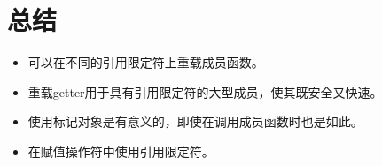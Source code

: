 \section{总结}
\begin{itemize}
	\item 可以在不同的引用限定符上重载成员函数。
	\item 重载getter用于具有引用限定符的大型成员，使其既安全又快速。
	\item 使用标记对象是有意义的，即使在调用成员函数时也是如此。
	\item 在赋值操作符中使用引用限定符。
\end{itemize}


